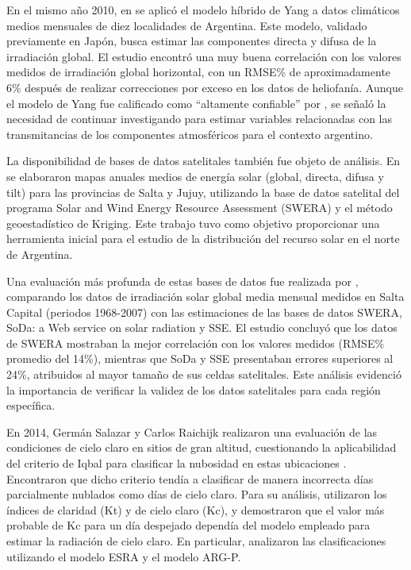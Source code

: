 \documentclass[letterpaper,12pt, twoside]{report}
\providecommand{\DIFdeltex}[1]{{\protect\color{red} \scriptsize #1}} %
\providecommand{\DIFdel}[1]{\texorpdfstring{\DIFdeltex{#1}}{}} %
\begin{document}
\DIFdel{En el mismo año 2010, en \cite{Salazar2010b} se aplicó el modelo híbrido de Yang a datos climáticos medios mensuales de diez localidades de Argentina. Este modelo, validado previamente en Japón, busca estimar las componentes directa y difusa de la irradiación global. El estudio encontró una muy buena correlación con los valores medidos de irradiación global horizontal, con un RMSE\% de aproximadamente 6\% después de realizar correcciones por exceso en los datos de heliofanía. Aunque el modelo de Yang fue calificado como ``altamente confiable'' por \cite{Gueymard2003}, se señaló la necesidad de continuar investigando para estimar variables relacionadas con las transmitancias de los componentes atmosféricos para el contexto argentino.}%

\DIFdel{La disponibilidad de bases de datos satelitales también fue objeto de análisis. En \cite{Laspiur2013} se elaboraron mapas anuales medios de energía solar (global, directa, difusa y tilt) para las provincias de Salta y Jujuy, utilizando la base de datos satelital del programa Solar and Wind Energy Resource Assessment (SWERA) \citep{OEDI} y el método geoestadístico de Kriging. Este trabajo tuvo como objetivo proporcionar una herramienta inicial para el estudio de la distribución del recurso solar en el norte de Argentina.}%

\DIFdel{Una evaluación más profunda de estas bases de datos fue realizada por \cite{Salazar2013}, comparando los datos de irradiación solar global media mensual medidos en Salta Capital (periodos 1968-2007) con las estimaciones de las bases de datos SWERA, SoDa: a Web service on solar radiation \citep{Wald2004} y SSE. El estudio concluyó que los datos de SWERA mostraban la mejor correlación con los valores medidos (RMSE\% promedio del 14\%), mientras que SoDa y SSE presentaban errores superiores al 24\%, atribuidos al mayor tamaño de sus celdas satelitales. Este análisis evidenció la importancia de verificar la validez de los datos satelitales para cada región específica.}%

\DIFdel{En 2014, Germán Salazar y Carlos Raichijk realizaron una evaluación de las condiciones de cielo claro en sitios de gran altitud, cuestionando la aplicabilidad del criterio de Iqbal para clasificar la nubosidad en estas ubicaciones \cite{Salazar2014}. Encontraron que dicho criterio tendía a clasificar de manera incorrecta días parcialmente nublados como días de cielo claro. Para su análisis, utilizaron los índices de claridad (Kt) y de cielo claro (Kc), y demostraron que el valor más probable de Kc para un día despejado dependía del modelo empleado para estimar la radiación de cielo claro. En particular, analizaron las clasificaciones utilizando el modelo ESRA \citep{Rigollier2000} y el modelo ARG-P.}%
\end{document}
